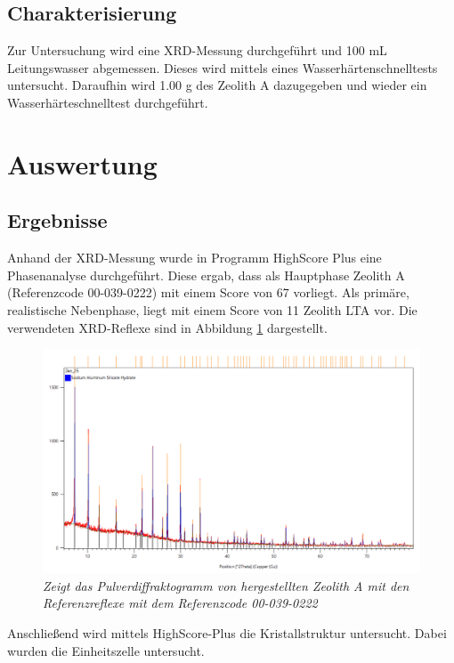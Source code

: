 \documentclass[12pt, a4paper]{article}
\begin{document}
\subsection{Charakterisierung}
{
Zur Untersuchung wird eine XRD-Messung durchgeführt und 100 mL Leitungswasser abgemessen. Dieses wird mittels eines Wasserhärtenschnelltests untersucht.
Daraufhin wird 1.00 g des Zeolith A dazugegeben und wieder ein Wasserhärteschnelltest durchgeführt.

}





\newpage
\section{Auswertung}
\subsection{Ergebnisse}
Anhand der XRD-Messung wurde in Programm HighScore Plus eine Phasenanalyse durchgeführt. 
Diese ergab, dass als Hauptphase Zeolith A (Referenzcode 00-039-0222) mit einem Score von 67 vorliegt. Als primäre, realistische Nebenphase,
liegt mit einem Score von 11 Zeolith LTA vor. Die verwendeten XRD-Reflexe sind in Abbildung \ref{XRD} dargestellt.
\begin{figure}[h!]

\begin{center}
  \includegraphics[scale=0.50]{Screenshot 2025-05-17 133057.png}
\end{center}
\caption{\textit{Zeigt das Pulverdiffraktogramm von hergestellten Zeolith A mit den Referenzreflexe mit dem Referenzcode 00-039-0222}}
\label{XRD}
\end{figure}
Anschließend wird mittels \mbox{HighScore-Plus} die Kristallstruktur untersucht. Dabei wurden die Einheitszelle untersucht.
\end{document}
